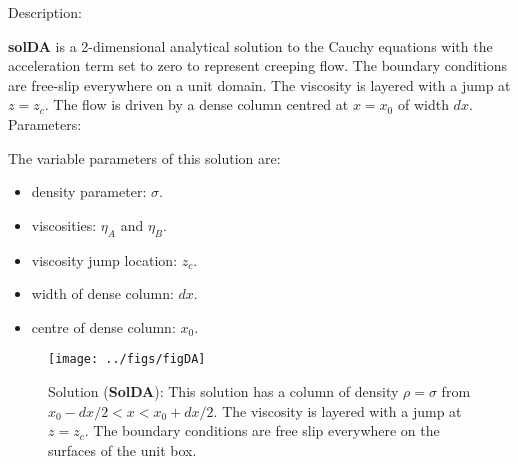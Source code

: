   {\large \fontB Description:}
  
  {\bf solDA} is a 2-dimensional analytical solution to the Cauchy equations with the acceleration term set to zero
  to represent creeping flow. The boundary conditions are free-slip everywhere on a unit domain.
  The viscosity is layered with a jump at $ z=z_c $.
  The flow is driven by a dense column centred at $ x=x_0 $ of width $dx$.
  \\
  
 {\large \fontB Parameters:}
  
 The variable parameters of this solution are:
 \begin{itemize}
   \item{density parameter: $ \sigma $.}
   \item{viscosities: $\eta_A$ and $\eta_B$.}
   \item{viscosity jump location: $z_c$.}
   \item{width of dense column: $dx$.}
   \item{centre of dense column: $x_0$.}
 \end{itemize}

  \begin{SCfigure}[][h]
    \texttt{[image: ../figs/figDA]}
    \caption[Short caption]{\label{figDA} 
      Solution ({\bf SolDA}):
      This solution has a column of density $\rho = \sigma$ from $x_0-dx/2 < x < x_0+dx/2$.
      The viscosity is layered with a jump at $ z=z_c $.
      The boundary conditions are free slip everywhere on the surfaces of the unit box.}
  \end{SCfigure} 
  

